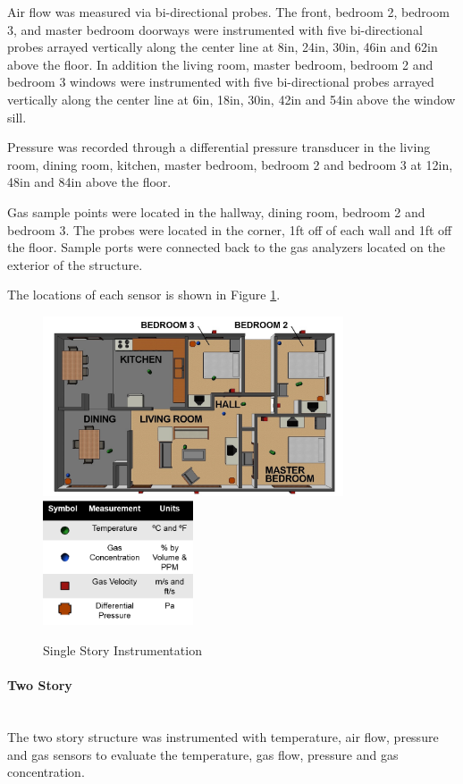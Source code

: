 \documentclass{article}
\begin{document}
Air flow was measured via bi-directional probes. The front, bedroom 2, bedroom 3, and master bedroom doorways were instrumented with five bi-directional probes arrayed vertically along the center line at 8in, 24in, 30in, 46in and 62in above the floor. In addition the living room, master bedroom, bedroom 2 and bedroom 3 windows were instrumented with five bi-directional probes arrayed vertically along the center line at 6in, 18in, 30in, 42in and 54in above the window sill. 

Pressure was recorded through a differential pressure transducer in the living room, dining room, kitchen, master bedroom, bedroom 2 and bedroom 3 at 12in, 48in and 84in above the floor. 

Gas sample points were located in the hallway, dining room, bedroom 2 and bedroom 3. The probes were located in the corner, 1ft off of each wall and 1ft off the floor. Sample ports were connected back to the gas analyzers located on the exterior of the structure. 

The locations of each sensor is shown in Figure \ref{fig:SingleStoryInst}.

\begin{figure}[H]
	\centering
	\includegraphics[width = 3.5in]{0_Images/Instrumentation/Single_Story_Instrumentation.png}
	\includegraphics[width = 1.75in]{0_Images/Instrumentation/Single_Story_Instrumentation_Key2.png}
	\caption{Single Story Instrumentation}
	\label{fig:SingleStoryInst}
\end{figure}

\paragraph{Two Story} \mbox{}\\
The two story structure was instrumented with temperature, air flow, pressure and gas sensors to evaluate the temperature, gas flow, pressure and gas concentration. 
\end{document}
